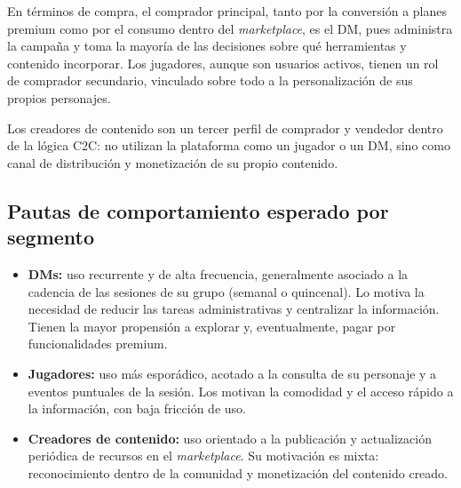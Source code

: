 En términos de compra, el comprador principal, tanto por la conversión a planes premium como por el consumo dentro del \textit{marketplace}, es el DM, pues administra la campaña y toma la mayoría de las decisiones sobre qué herramientas y contenido incorporar. Los jugadores, aunque son usuarios activos, tienen un rol de comprador secundario, vinculado sobre todo a la personalización de sus propios personajes.

Los creadores de contenido son un tercer perfil de comprador y vendedor dentro de la lógica C2C: no utilizan la plataforma como un jugador o un DM, sino como canal de distribución y monetización de su propio contenido.

\subsection{Pautas de comportamiento esperado por segmento}
\begin{itemize}
  \item \textbf{DMs:} uso recurrente y de alta frecuencia, generalmente asociado a la cadencia de las sesiones de su grupo (semanal o quincenal). Lo motiva la necesidad de reducir las tareas administrativas y centralizar la información. Tienen la mayor propensión a explorar y, eventualmente, pagar por funcionalidades premium.
  \item \textbf{Jugadores:} uso más esporádico, acotado a la consulta de su personaje y a eventos puntuales de la sesión. Los motivan la comodidad y el acceso rápido a la información, con baja fricción de uso.
  \item \textbf{Creadores de contenido:} uso orientado a la publicación y actualización periódica de recursos en el \textit{marketplace}. Su motivación es mixta: reconocimiento dentro de la comunidad y monetización del contenido creado.
\end{itemize}
